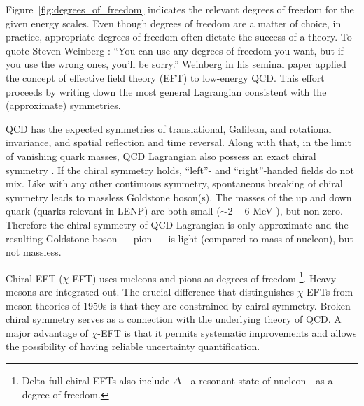 	Figure~\ref{fig:degrees_of_freedom} indicates the relevant degrees of freedom
	for the given energy scales.  Even though degrees of freedom are a matter of
	choice, in practice, appropriate degrees of freedom often dictate the
	success of a theory.  To quote Steven Weinberg \cite{Guth:1984rq}:
	``You can use any degrees of freedom you want, but if you use the wrong ones,
	you'll be sorry.''
	Weinberg in his seminal paper \cite{Weinberg:1978kz} applied the concept
	of effective field theory (EFT) to low-energy QCD.  This effort
	proceeds by writing down the most general Lagrangian consistent with the
	(approximate) symmetries.

	QCD has the expected symmetries of translational, Galilean, and rotational
	invariance, and spatial reflection and time reversal.  Along with that,
	in the limit of vanishing quark masses, QCD Lagrangian also possess an exact
	chiral symmetry \cite{Peskin1995a}.  If the chiral symmetry holds,
	``left''- and
	``right''-handed fields do not mix.  Like with any other continuous symmetry,
	spontaneous breaking of chiral symmetry leads to massless Goldstone boson(s).
	The masses of the up and down quark (quarks relevant in LENP) are both small
	($\sim 2 - 6$ MeV \cite{Agashe:2014kda}), but non-zero.  Therefore the
	chiral symmetry of QCD Lagrangian is only approximate and the resulting
	Goldstone boson --- pion --- is light (compared to mass of nucleon), but not
	massless.

	Chiral EFT ($\chi$-EFT) uses nucleons and pions as degrees of freedom
	\footnote{Delta-full chiral EFTs also include
	$\Delta$---a resonant state of nucleon---as a degree of freedom. }.
	Heavy mesons are
	integrated out.  The crucial difference that distinguishes $\chi$-EFTs from
	meson theories of 1950s is that they are constrained by chiral symmetry.
	Broken chiral symmetry serves as a connection with the underlying theory of
	QCD.
	A major advantage of $\chi$-EFT is that it permits systematic improvements
	and allows the possibility of having reliable uncertainty quantification.


